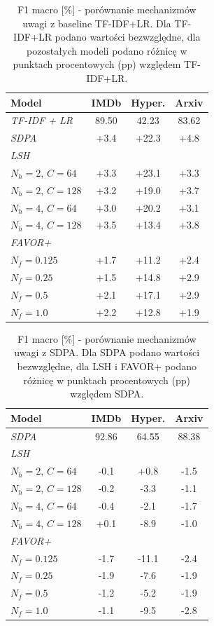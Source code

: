 \documentclass[a4paper,11pt,twoside]{report}
\theoremstyle{definition}
\begin{document}
\begin{table}[t!]
\centering
\caption{F1 macro [\%] - porównanie mechanizmów uwagi z baseline TF-IDF+LR. Dla TF-IDF+LR podano wartości bezwzględne, dla pozostałych modeli podano różnicę w punktach procentowych (pp) względem TF-IDF+LR.}
\label{tab:attention-f1-vs-baseline}
\smallskip
\begin{tabular}{@{}lccc@{}}
\toprule
\textbf{Model} & \textbf{IMDb} & \textbf{Hyper.} & \textbf{Arxiv} \\
\midrule
\textit{TF-IDF + LR} & 89.50 & 42.23 & 83.62 \\
\midrule
\textit{SDPA} & +3.4 & +22.3 & +4.8 \\
\midrule
\multicolumn{4}{l}{\textit{LSH}} \\
$N_h{=}2$, $C{=}64$ & +3.3 & +23.1 & +3.3 \\
$N_h{=}2$, $C{=}128$ & +3.2 & +19.0 & +3.7 \\
$N_h{=}4$, $C{=}64$ & +3.0 & +20.2 & +3.1 \\
$N_h{=}4$, $C{=}128$ & +3.5 & +13.4 & +3.8 \\
\midrule
\multicolumn{4}{l}{\textit{FAVOR+}} \\
$N_f{=}0.125$ & +1.7 & +11.2 & +2.4 \\
$N_f{=}0.25$ & +1.5 & +14.8 & +2.9 \\
$N_f{=}0.5$ & +2.1 & +17.1 & +2.9 \\
$N_f{=}1.0$ & +2.2 & +12.8 & +1.9 \\
\bottomrule
\end{tabular}
\end{table}


\begin{table}[t!]
\centering
\caption{F1 macro [\%] - porównanie mechanizmów uwagi z SDPA. Dla SDPA podano wartości bezwzględne, dla LSH i FAVOR+ podano różnicę w punktach procentowych (pp) względem SDPA.}
\label{tab:attention-f1-vs-sdpa}
\smallskip
\begin{tabular}{@{}lccc@{}}
\toprule
\textbf{Model} & \textbf{IMDb} & \textbf{Hyper.} & \textbf{Arxiv} \\
\midrule
\textit{SDPA} & 92.86 & 64.55 & 88.38 \\
\midrule
\multicolumn{4}{l}{\textit{LSH}} \\
$N_h{=}2$, $C{=}64$ & -0.1 & +0.8 & -1.5 \\
$N_h{=}2$, $C{=}128$ & -0.2 & -3.3 & -1.1 \\
$N_h{=}4$, $C{=}64$ & -0.4 & -2.1 & -1.7 \\
$N_h{=}4$, $C{=}128$ & +0.1 & -8.9 & -1.0 \\
\midrule
\multicolumn{4}{l}{\textit{FAVOR+}} \\
$N_f{=}0.125$ & -1.7 & -11.1 & -2.4 \\
$N_f{=}0.25$ & -1.9 & -7.6 & -1.9 \\
$N_f{=}0.5$ & -1.2 & -5.2 & -1.9 \\
$N_f{=}1.0$ & -1.1 & -9.5 & -2.8 \\
\bottomrule
\end{tabular}
\end{table}
\end{document}
